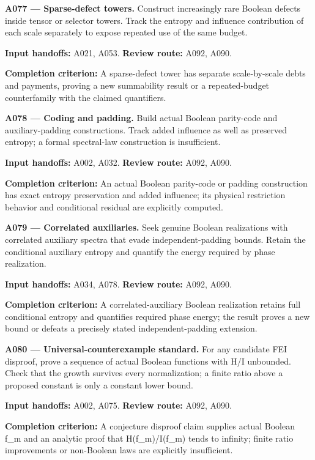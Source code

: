 \documentclass[11pt]{article}
\begin{document}
\textbf{A077 --- Sparse-defect towers.} Construct increasingly rare Boolean defects inside tensor or selector towers. Track the entropy and influence contribution of each scale separately to expose repeated use of the same budget.

{\small\color{ink}\textbf{Input handoffs:} A021, A053. \textbf{Review route:} A092, A090.\par
\textbf{Completion criterion:} A sparse-defect tower has separate scale-by-scale debts and payments, proving a new summability result or a repeated-budget counterfamily with the claimed quantifiers.\par}



\textbf{A078 --- Coding and padding.} Build actual Boolean parity-code and auxiliary-padding constructions. Track added influence as well as preserved entropy; a formal spectral-law construction is insufficient.

{\small\color{ink}\textbf{Input handoffs:} A002, A032. \textbf{Review route:} A092, A090.\par
\textbf{Completion criterion:} An actual Boolean parity-code or padding construction has exact entropy preservation and added influence; its physical restriction behavior and conditional residual are explicitly computed.\par}



\textbf{A079 --- Correlated auxiliaries.} Seek genuine Boolean realizations with correlated auxiliary spectra that evade independent-padding bounds. Retain the conditional auxiliary entropy and quantify the energy required by phase realization.

{\small\color{ink}\textbf{Input handoffs:} A034, A078. \textbf{Review route:} A092, A090.\par
\textbf{Completion criterion:} A correlated-auxiliary Boolean realization retains full conditional entropy and quantifies required phase energy; the result proves a new bound or defeats a precisely stated independent-padding extension.\par}



\textbf{A080 --- Universal-counterexample standard.} For any candidate FEI disproof, prove a sequence of actual Boolean functions with H/I unbounded. Check that the growth survives every normalization; a finite ratio above a proposed constant is only a constant lower bound.

{\small\color{ink}\textbf{Input handoffs:} A002, A075. \textbf{Review route:} A092, A090.\par
\textbf{Completion criterion:} A conjecture disproof claim supplies actual Boolean f\_m and an analytic proof that H(f\_m)/I(f\_m) tends to infinity; finite ratio improvements or non-Boolean laws are explicitly insufficient.\par}
\end{document}
